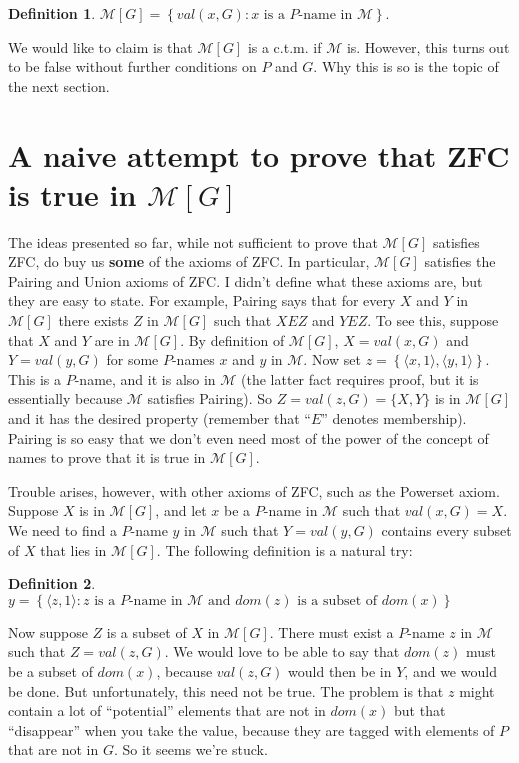 \documentclass[10pt]{article}
\newcommand\axiom[1]{\textmd{#1}}
\theoremstyle{definition}
\newtheorem*{defn}{Definition}
\begin{document}
\begin{defn}
$\mathcal M[G] = \left\{val(x,G) : x\text{ is a }P\text{-name in }\mathcal M\right\}.$
\end{defn}

We would like to claim is that $\mathcal M[G]$ is a c.t.m. if $\mathcal M$ is. However, this turns out to be false without further conditions on $P$ and $G$. Why this is so is the topic of the next section.


\section{A naive attempt to prove that \axiom{ZFC} is true in $\mathcal M[G]$}

The ideas presented so far, while not sufficient to prove that $\mathcal M[G]$ satisfies \axiom{ZFC}, do buy us \textbf{some} of the axioms of \axiom{ZFC}. In particular, $\mathcal M[G]$ satisfies the Pairing and Union axioms of \axiom{ZFC}. I didn't define what these axioms are, but they are easy to state. For example, Pairing says that for every $X$ and $Y$ in $\mathcal M[G]$ there exists $Z$ in $\mathcal M[G]$ such that $X E Z$ and $Y E Z$. To see this, suppose that $X$ and $Y$ are in $\mathcal M[G]$. By definition of $\mathcal M[G]$, $X = val(x,G)$ and $Y = val(y,G)$ for some $P$-names $x$ and $y$ in $\mathcal M$. Now set $z = \left\{\langle x,1\rangle, \langle y,1\rangle\right\}$. This is a $P$-name, and it is also in $\mathcal M$ (the latter fact requires proof, but it is essentially because $\mathcal M$ satisfies Pairing). So $Z = val(z,G) = \{X,Y\}$ is in $\mathcal M[G]$ and it has the desired property (remember that ``$E$'' denotes membership). Pairing is so easy that we don't even need most of the power of the concept of names to prove that it is true in $\mathcal M[G]$.

Trouble arises, however, with other axioms of \axiom{ZFC}, such as the Powerset axiom. Suppose $X$ is in $\mathcal M[G]$, and let $x$ be a $P$-name in $\mathcal M$ such that $val(x,G) = X$. We need to find a $P$-name $y$ in $\mathcal M$ such that $Y = val(y,G)$ contains every subset of $X$ that lies in $\mathcal M[G]$. The following definition is a natural try:

\begin{defn}
$y = \left\{\langle z,1\rangle : z\text{ is a }P\text{-name in }\mathcal M\text{ and }dom(z)\text{ is a subset of }dom(x)\right\}$
\end{defn}

Now suppose $Z$ is a subset of $X$ in $\mathcal M[G]$. There must exist a $P$-name $z$ in $\mathcal M$ such that $Z = val(z,G)$. We would love to be able to say that $dom(z)$ must be a subset of $dom(x)$, because $val(z,G)$ would then be in $Y$, and we would be done. But unfortunately, this need not be true. The problem is that $z$ might contain a lot of ``potential'' elements that are not in $dom(x)$ but that ``disappear'' when you take the value, because they are tagged with elements of $P$ that are not in $G$. So it seems we're stuck.
\end{document}
